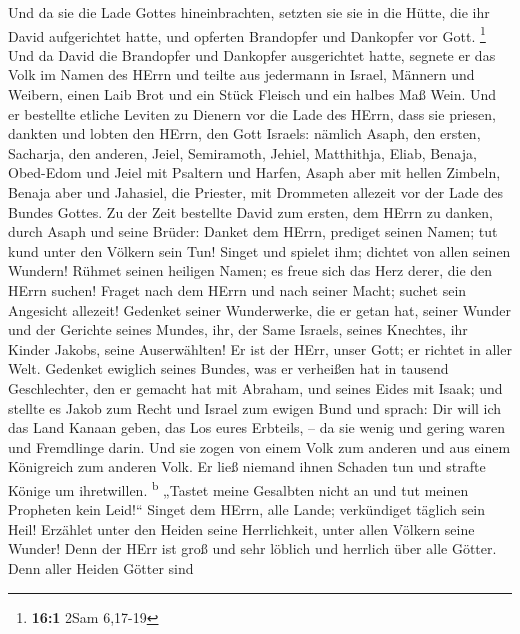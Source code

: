  Und da sie die Lade Gottes hineinbrachten, setzten sie
sie in die Hütte, die ihr David aufgerichtet hatte, und opferten
Brandopfer und Dankopfer vor Gott. \footnote{\textbf{16:1} 2Sam 6,17-19}
 Und da David die Brandopfer und Dankopfer ausgerichtet
hatte, segnete er das Volk im Namen des HErrn  und teilte
aus jedermann in Israel, Männern und Weibern, einen Laib Brot und ein
Stück Fleisch und ein halbes Maß Wein.  Und er bestellte
etliche Leviten zu Dienern vor die Lade des HErrn, dass sie priesen,
dankten und lobten den HErrn, den Gott Israels:  nämlich
Asaph, den ersten, Sacharja, den anderen, Jeiel, Semiramoth, Jehiel,
Matthithja, Eliab, Benaja, Obed-Edom und Jeiel mit Psaltern und Harfen,
Asaph aber mit hellen Zimbeln,  Benaja aber und Jahasiel,
die Priester, mit Drommeten allezeit vor der Lade des Bundes Gottes.
 Zu der Zeit bestellte David zum ersten, dem HErrn zu
danken, durch Asaph und seine Brüder:  Danket dem HErrn,
prediget seinen Namen; tut kund unter den Völkern sein Tun!
 Singet und spielet ihm; dichtet von allen seinen Wundern!
 Rühmet seinen heiligen Namen; es freue sich das Herz
derer, die den HErrn suchen!  Fraget nach dem HErrn und
nach seiner Macht; suchet sein Angesicht allezeit! 
Gedenket seiner Wunderwerke, die er getan hat, seiner Wunder und der
Gerichte seines Mundes,  ihr, der Same Israels, seines
Knechtes, ihr Kinder Jakobs, seine Auserwählten!  Er ist
der HErr, unser Gott; er richtet in aller Welt.  Gedenket
ewiglich seines Bundes, was er verheißen hat in tausend Geschlechter,
 den er gemacht hat mit Abraham, und seines Eides mit
Isaak;  und stellte es Jakob zum Recht und Israel zum
ewigen Bund  und sprach: Dir will ich das Land Kanaan
geben, das Los eures Erbteils, --  da sie wenig und
gering waren und Fremdlinge darin.  Und sie zogen von
einem Volk zum anderen und aus einem Königreich zum anderen Volk.
 Er ließ niemand ihnen Schaden tun und strafte Könige um
ihretwillen. \textsuperscript{b}  „Tastet meine Gesalbten
nicht an und tut meinen Propheten kein Leid!{}``  Singet
dem HErrn, alle Lande; verkündiget täglich sein Heil! 
Erzählet unter den Heiden seine Herrlichkeit, unter allen Völkern seine
Wunder!  Denn der HErr ist groß und sehr löblich und
herrlich über alle Götter.  Denn aller Heiden Götter sind
